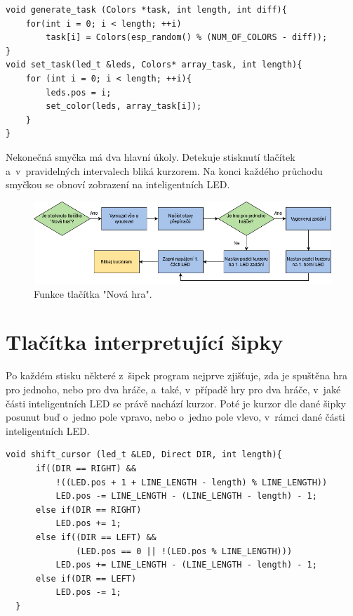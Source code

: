 \begin{minipage}{\linewidth}
\begin{lstlisting}[frame=single,numbers=right,caption={Funkce pro vygenerování zadání.},label=lst:priklad.vypis.kodu.C,basicstyle=\ttfamily\small, keywordstyle=\color{black}\bfseries\underbar,]
void generate_task (Colors *task, int length, int diff){
    for(int i = 0; i < length; ++i)
        task[i] = Colors(esp_random() % (NUM_OF_COLORS - diff));
}     
void set_task(led_t &leds, Colors* array_task, int length){
    for (int i = 0; i < length; ++i){
        leds.pos = i;
        set_color(leds, array_task[i]); 
    } 
}   
\end{lstlisting}
\end{minipage} 

Nekonečná smyčka má dva hlavní úkoly. Detekuje stisknutí tlačítek a~v~pravidelných intervalech bliká kurzorem. Na konci každého průchodu smyčkou 
se obnoví zobrazení na inteligentních LED.

  \begin{figure}[!h]
    \begin{center}
      \includegraphics[scale=0.5]{obrazky/Nova_hra.png}
    \end{center}
    \caption[Funkce tlačítka Nová hra]{Funkce tlačítka "Nová hra".}
  \end{figure}

\newpage
\section{Tlačítka interpretující šipky}
Po každém stisku některé z~šipek program nejprve zjišťuje, zda je spuštěna hra pro jednoho, nebo pro dva hráče, a~také, v~případě hry pro dva
hráče, v~jaké části inteligentních LED se právě nachází kurzor. Poté je kurzor dle dané šipky posunut buď o~jedno pole vpravo, nebo o~jedno 
pole vlevo, v~rámci dané části inteligentních LED. 

\begin{minipage}{\linewidth}
  \begin{lstlisting}[frame=single,numbers=right,caption={Funkce posouvající kurzor.},label=lst:priklad.vypis.kodu.C,basicstyle=\ttfamily\small, keywordstyle=\color{black}\bfseries\underbar,]
  void shift_cursor (led_t &LED, Direct DIR, int length){
      if((DIR == RIGHT) && 
          !((LED.pos + 1 + LINE_LENGTH - length) % LINE_LENGTH))
          LED.pos -= LINE_LENGTH - (LINE_LENGTH - length) - 1;
      else if(DIR == RIGHT)
          LED.pos += 1;
      else if((DIR == LEFT) && 
              (LED.pos == 0 || !(LED.pos % LINE_LENGTH)))
          LED.pos += LINE_LENGTH - (LINE_LENGTH - length) - 1;
      else if(DIR == LEFT)
          LED.pos -= 1;
  }   
  \end{lstlisting}
  \end{minipage} 

